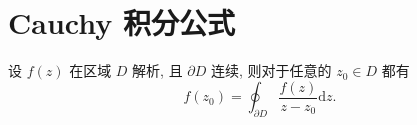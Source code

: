     \section{Cauchy 积分公式}
        \begin{theorem}
            设 $f\left(z\right)$ 在区域 $D$ 解析, 且 $\partial D$ 连续, 则对于任意的 $z_0\in D$ 都有
            $$
            f\left(z_0\right) = \oint_{\partial D}{\dfrac{f\left(z\right)}{z-z_0}\mathrm{d}z}.
            $$
        \end{theorem}